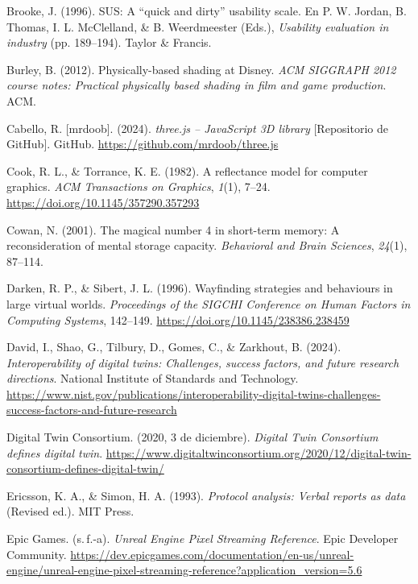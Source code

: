 \begin{list}{}
\item Brooke, J. (1996). SUS: A ``quick and dirty'' usability scale. En P. W. Jordan, B. Thomas, I. L. McClelland, \& B. Weerdmeester (Eds.), \textit{Usability evaluation in industry} (pp. 189--194). Taylor \& Francis.

\item Burley, B. (2012). Physically-based shading at Disney. \textit{ACM SIGGRAPH 2012 course notes: Practical physically based shading in film and game production}. ACM.

\item Cabello, R. [mrdoob]. (2024). \textit{three.js -- JavaScript 3D library} [Repositorio de GitHub]. GitHub. \url{https://github.com/mrdoob/three.js}

\item Cook, R. L., \& Torrance, K. E. (1982). A reflectance model for computer graphics. \textit{ACM Transactions on Graphics}, \textit{1}(1), 7--24. \url{https://doi.org/10.1145/357290.357293}

\item Cowan, N. (2001). The magical number 4 in short-term memory: A reconsideration of mental storage capacity. \textit{Behavioral and Brain Sciences}, \textit{24}(1), 87--114.

\item Darken, R. P., \& Sibert, J. L. (1996). Wayfinding strategies and behaviours in large virtual worlds. \textit{Proceedings of the SIGCHI Conference on Human Factors in Computing Systems}, 142--149. \url{https://doi.org/10.1145/238386.238459}

\item David, I., Shao, G., Tilbury, D., Gomes, C., \& Zarkhout, B. (2024). \textit{Interoperability of digital twins: Challenges, success factors, and future research directions}. National Institute of Standards and Technology. \url{https://www.nist.gov/publications/interoperability-digital-twins-challenges-success-factors-and-future-research}

\item Digital Twin Consortium. (2020, 3 de diciembre). \textit{Digital Twin Consortium defines digital twin}. \url{https://www.digitaltwinconsortium.org/2020/12/digital-twin-consortium-defines-digital-twin/}

\item Ericsson, K. A., \& Simon, H. A. (1993). \textit{Protocol analysis: Verbal reports as data} (Revised ed.). MIT Press.

\item Epic Games. (s.\,f.-a). \textit{Unreal Engine Pixel Streaming Reference}. Epic Developer Community. \url{https://dev.epicgames.com/documentation/en-us/unreal-engine/unreal-engine-pixel-streaming-reference?application_version=5.6}


\end{list}
